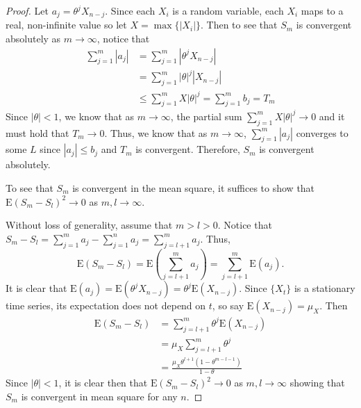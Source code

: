 \documentclass[12pt]{article}
\theoremstyle{definition}
\newcommand{\E}{\text{E}}
\begin{document}
\begin{proof}
  Let $a_j = \theta ^ j X_{n-j}$. Since each $X_i$ is a random variable, each $X_i$
  maps to a real, non-infinite value so let $X = \max\{|X_i|\}$. Then to see that $S_m$ is convergent absolutely
  as $m \to \infty$, notice that
  \begin{align*}
    \sum_{j=1}^{m} |a_j|
    &= \sum_{j=1}^{m} |\theta ^ j X_{n-j}| \\
    &= \sum_{j=1}^{m} |\theta| ^ j |X_{n-j}|\\
    &\leq \sum_{j=1}^{m} X|\theta| ^ j = \sum_{j=1}^{m} b_j = T_m
  \end{align*}
  Since $|\theta|<1$, we know that as $m \to \infty$, the partial sum $\sum_{j=1}^m X|\theta|^j \to 0$
  and it must hold that $T_m \to 0$. Thus, we know that as $m \to \infty$, $\sum_{j=1}^{m} |a_j|$ converges to some $L$ since $|a_j| \leq b_j$
  and $T_m$ is convergent. Therefore, $S_m$ is convergent absolutely.

  To see that $S_m$ is convergent in the mean square, it suffices to show that
  $\E(S_m - S_l)^2 \to 0$ as $m, l \to \infty$.

  Without loss of generality, assume that $m > l > 0$. Notice that
  $S_m - S_l = \sum_{j=1}^m a_j - \sum_{j=1}^n a_j = \sum_{j=l+1}^{m} a_j$.
  Thus, $$\E(S_m - S_l) = \E(\sum_{j=l+1}^{m} a_j) = \sum_{j=l+1}^m \E(a_j).$$
  It is clear that $\E(a_j) = \E(\theta^j X_{n-j}) = \theta^j \E(X_{n-j})$. Since
  $\{X_t\}$ is a stationary time series, its expectation does not depend on $t$,
  so say $\E(X_{n-j}) = \mu_X$. Then
  \begin{align*}
    \E(S_m - S_l)
    &= \sum_{j=l+1}^m \theta^j\E(X_{n-j}) \\
    &=\mu_X \sum_{j=l+1}^m \theta^j \\
    &= \frac{\mu_X\theta^{l+1}(1-\theta^{m-l-1})}{1-\theta}
  \end{align*}
  Since $|\theta| < 1$, it is clear then that $\E(S_m - S_l)^2 \to 0$ as $m,l \to \infty$
  showing that $S_m$ is convergent in mean square for any $n$.
\end{proof}
\end{document}
